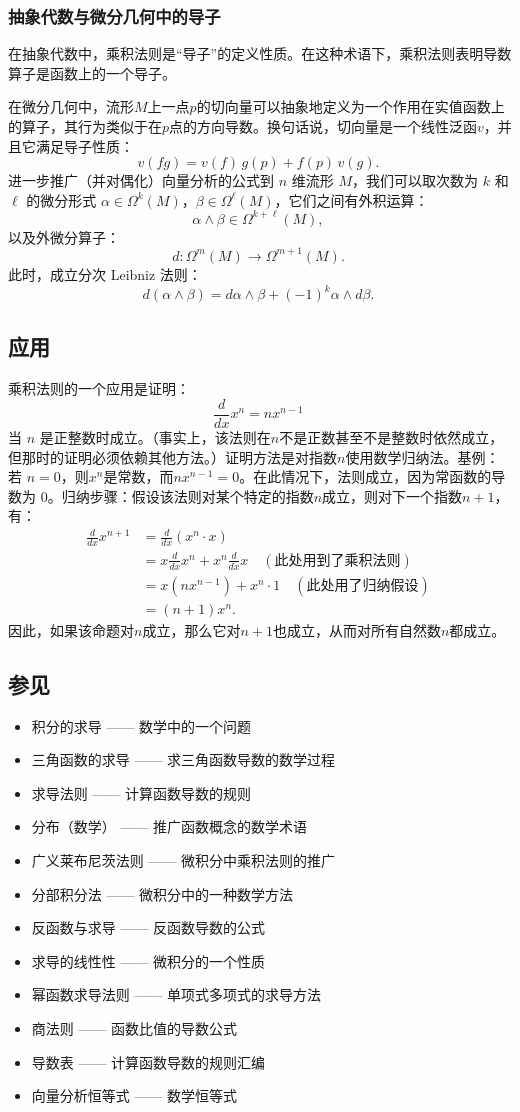 \subsubsection{抽象代数与微分几何中的导子}
在抽象代数中，乘积法则是“导子”的定义性质。在这种术语下，乘积法则表明导数算子是函数上的一个导子。

在微分几何中，流形$M$上一点$p$的切向量可以抽象地定义为一个作用在实值函数上的算子，其行为类似于在$p$点的方向导数。换句话说，切向量是一个线性泛函$v$，并且它满足导子性质：
$$
v(fg) = v(f)\, g(p) + f(p)\, v(g).~
$$
进一步推广（并对偶化）向量分析的公式到 $n$ 维流形 $M$，我们可以取次数为 $k$ 和 $\ell$ 的微分形式 $\alpha \in \Omega^k(M)$，$\beta \in \Omega^\ell(M)$，它们之间有外积运算：
$$
\alpha \wedge \beta \in \Omega^{k+\ell}(M),~
$$
以及外微分算子：
$$
d : \Omega^m(M) \to \Omega^{m+1}(M).~
$$
此时，成立分次 Leibniz 法则：
$$
d(\alpha \wedge \beta) = d\alpha \wedge \beta + (-1)^k \alpha \wedge d\beta.~
$$
\subsection{应用}
乘积法则的一个应用是证明：
$$
\frac{d}{dx} x^n = n x^{n-1}~
$$
当 $n$ 是正整数时成立。（事实上，该法则在$n$不是正数甚至不是整数时依然成立，但那时的证明必须依赖其他方法。）证明方法是对指数$n$使用数学归纳法。基例：若 $n=0$，则$x^n$是常数，而$n x^{n-1} = 0$。在此情况下，法则成立，因为常函数的导数为 0。归纳步骤：假设该法则对某个特定的指数$n$成立，则对下一个指数$n+1$，有：
$$
\begin{aligned}
\frac{d}{dx} x^{n+1} 
&= \frac{d}{dx}(x^n \cdot x) \\
&= x \frac{d}{dx} x^n + x^n \frac{d}{dx} x \quad (\text{此处用到了乘积法则})\\
&= x \left( n x^{n-1} \right) + x^n \cdot 1 \quad (\text{此处用了归纳假设})\\
&= (n+1) x^n.~
\end{aligned}~
$$
因此，如果该命题对$n$成立，那么它对$n+1$也成立，从而对所有自然数$n$都成立。
\subsection{参见}
\begin{itemize}
\item 积分的求导 —— 数学中的一个问题
\item 三角函数的求导 —— 求三角函数导数的数学过程
\item 求导法则 —— 计算函数导数的规则
\item 分布（数学） —— 推广函数概念的数学术语
\item 广义莱布尼茨法则 —— 微积分中乘积法则的推广
\item 分部积分法 —— 微积分中的一种数学方法
\item 反函数与求导 —— 反函数导数的公式
\item 求导的线性性 —— 微积分的一个性质
\item 幂函数求导法则 —— 单项式多项式的求导方法
\item 商法则 —— 函数比值的导数公式
\item 导数表 —— 计算函数导数的规则汇编
\item 向量分析恒等式 —— 数学恒等式
\end{itemize}
